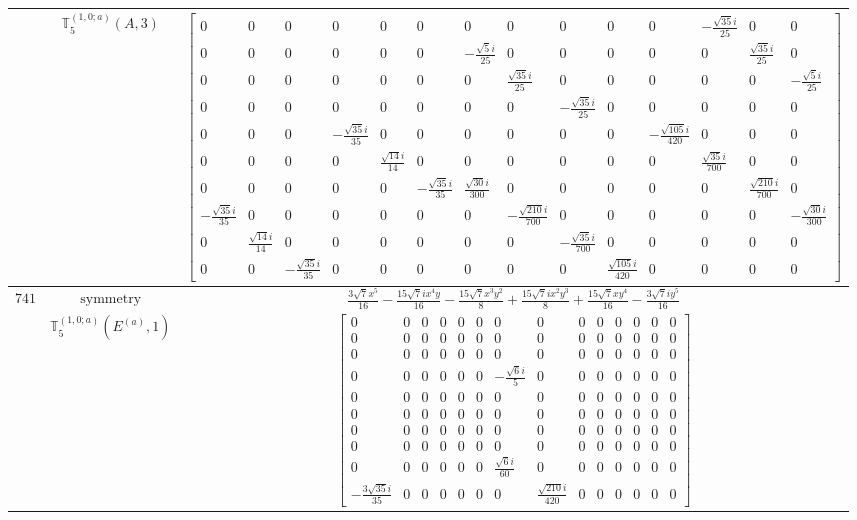 \documentclass[fleqn,8pt,landscape]{jsarticle}
\begin{document}
\begin{longtable}{ccc}
$  $ & $ \mathbb{T}_{5}^{(1,0;a)}(A,3) $ & $ \begin{bmatrix} 0 & 0 & 0 & 0 & 0 & 0 & 0 & 0 & 0 & 0 & 0 & - \frac{\sqrt{35} i}{25} & 0 & 0 \\ 0 & 0 & 0 & 0 & 0 & 0 & - \frac{\sqrt{5} i}{25} & 0 & 0 & 0 & 0 & 0 & \frac{\sqrt{35} i}{25} & 0 \\ 0 & 0 & 0 & 0 & 0 & 0 & 0 & \frac{\sqrt{35} i}{25} & 0 & 0 & 0 & 0 & 0 & - \frac{\sqrt{5} i}{25} \\ 0 & 0 & 0 & 0 & 0 & 0 & 0 & 0 & - \frac{\sqrt{35} i}{25} & 0 & 0 & 0 & 0 & 0 \\ 0 & 0 & 0 & - \frac{\sqrt{35} i}{35} & 0 & 0 & 0 & 0 & 0 & 0 & - \frac{\sqrt{105} i}{420} & 0 & 0 & 0 \\ 0 & 0 & 0 & 0 & \frac{\sqrt{14} i}{14} & 0 & 0 & 0 & 0 & 0 & 0 & \frac{\sqrt{35} i}{700} & 0 & 0 \\ 0 & 0 & 0 & 0 & 0 & - \frac{\sqrt{35} i}{35} & \frac{\sqrt{30} i}{300} & 0 & 0 & 0 & 0 & 0 & \frac{\sqrt{210} i}{700} & 0 \\ - \frac{\sqrt{35} i}{35} & 0 & 0 & 0 & 0 & 0 & 0 & - \frac{\sqrt{210} i}{700} & 0 & 0 & 0 & 0 & 0 & - \frac{\sqrt{30} i}{300} \\ 0 & \frac{\sqrt{14} i}{14} & 0 & 0 & 0 & 0 & 0 & 0 & - \frac{\sqrt{35} i}{700} & 0 & 0 & 0 & 0 & 0 \\ 0 & 0 & - \frac{\sqrt{35} i}{35} & 0 & 0 & 0 & 0 & 0 & 0 & \frac{\sqrt{105} i}{420} & 0 & 0 & 0 & 0 \end{bmatrix} $ \\ \hline
$ 741 $ & $ \text{symmetry} $ & $ \frac{3 \sqrt{7} x^{5}}{16} - \frac{15 \sqrt{7} i x^{4} y}{16} - \frac{15 \sqrt{7} x^{3} y^{2}}{8} + \frac{15 \sqrt{7} i x^{2} y^{3}}{8} + \frac{15 \sqrt{7} x y^{4}}{16} - \frac{3 \sqrt{7} i y^{5}}{16} $ \\
$  $ & $ \mathbb{T}_{5}^{(1,0;a)}(E^{(a)},1) $ & $ \begin{bmatrix} 0 & 0 & 0 & 0 & 0 & 0 & 0 & 0 & 0 & 0 & 0 & 0 & 0 & 0 \\ 0 & 0 & 0 & 0 & 0 & 0 & 0 & 0 & 0 & 0 & 0 & 0 & 0 & 0 \\ 0 & 0 & 0 & 0 & 0 & 0 & 0 & 0 & 0 & 0 & 0 & 0 & 0 & 0 \\ 0 & 0 & 0 & 0 & 0 & 0 & - \frac{\sqrt{6} i}{5} & 0 & 0 & 0 & 0 & 0 & 0 & 0 \\ 0 & 0 & 0 & 0 & 0 & 0 & 0 & 0 & 0 & 0 & 0 & 0 & 0 & 0 \\ 0 & 0 & 0 & 0 & 0 & 0 & 0 & 0 & 0 & 0 & 0 & 0 & 0 & 0 \\ 0 & 0 & 0 & 0 & 0 & 0 & 0 & 0 & 0 & 0 & 0 & 0 & 0 & 0 \\ 0 & 0 & 0 & 0 & 0 & 0 & 0 & 0 & 0 & 0 & 0 & 0 & 0 & 0 \\ 0 & 0 & 0 & 0 & 0 & 0 & \frac{\sqrt{6} i}{60} & 0 & 0 & 0 & 0 & 0 & 0 & 0 \\ - \frac{3 \sqrt{35} i}{35} & 0 & 0 & 0 & 0 & 0 & 0 & \frac{\sqrt{210} i}{420} & 0 & 0 & 0 & 0 & 0 & 0 \end{bmatrix} $ \\ \hline

\end{longtable}
\end{document}
